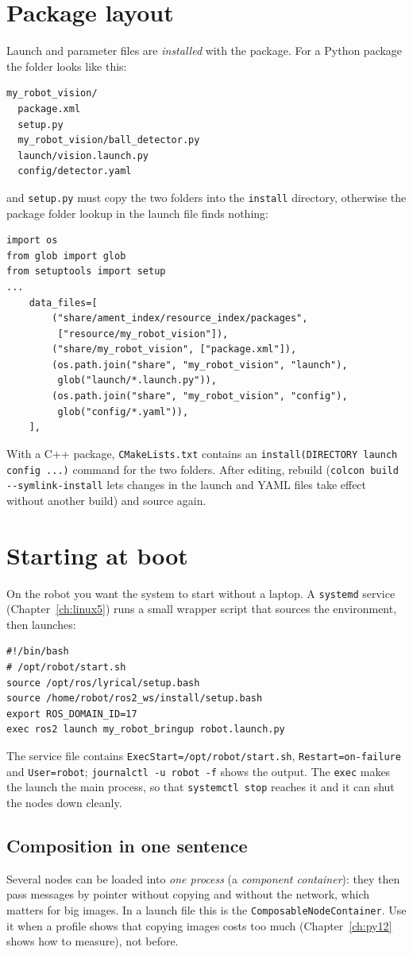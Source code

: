 \section*{Package layout}
Launch and parameter files are \emph{installed} with the package. For a Python package the folder looks like this:
\begin{verbatim}
my_robot_vision/
  package.xml
  setup.py
  my_robot_vision/ball_detector.py
  launch/vision.launch.py
  config/detector.yaml
\end{verbatim}
and \verb!setup.py! must copy the two folders into the \verb!install! directory, otherwise the package folder lookup in the launch file finds nothing:
\begin{verbatim}
import os
from glob import glob
from setuptools import setup
...
    data_files=[
        ("share/ament_index/resource_index/packages",
         ["resource/my_robot_vision"]),
        ("share/my_robot_vision", ["package.xml"]),
        (os.path.join("share", "my_robot_vision", "launch"),
         glob("launch/*.launch.py")),
        (os.path.join("share", "my_robot_vision", "config"),
         glob("config/*.yaml")),
    ],
\end{verbatim}
With a C++ package, \verb!CMakeLists.txt! contains an \verb!install(DIRECTORY launch config ...)! command for the two folders. After editing, rebuild (\verb!colcon build --symlink-install! lets changes in the launch and YAML files take effect without another build) and source again.

\section*{Starting at boot}
On the robot you want the system to start without a laptop. A \verb!systemd! service (Chapter~\ref{ch:linux5}) runs a small wrapper script that sources the environment, then launches:
\begin{verbatim}
#!/bin/bash
# /opt/robot/start.sh
source /opt/ros/lyrical/setup.bash
source /home/robot/ros2_ws/install/setup.bash
export ROS_DOMAIN_ID=17
exec ros2 launch my_robot_bringup robot.launch.py
\end{verbatim}
The service file contains \verb!ExecStart=/opt/robot/start.sh!, \verb!Restart=on-failure! and \verb!User=robot!; \verb!journalctl -u robot -f! shows the output. The \verb!exec! makes the launch the main process, so that \verb!systemctl stop! reaches it and it can shut the nodes down cleanly.

\subsection*{Composition in one sentence}
Several nodes can be loaded into \emph{one process} (a \emph{component container}): they then pass messages by pointer without copying and without the network, which matters for big images. In a launch file this is the \verb!ComposableNodeContainer!. Use it when a profile shows that copying images costs too much (Chapter~\ref{ch:py12} shows how to measure), not before.

